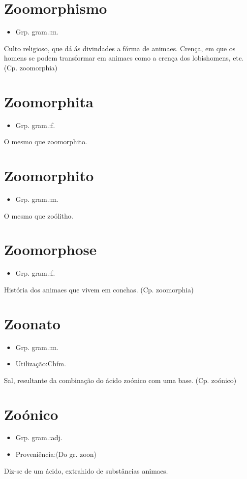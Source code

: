 \section{Zoomorphismo}
\begin{itemize}
\item {Grp. gram.:m.}
\end{itemize}
Culto religioso, que dá ás divindades a fórma de animaes.
Crença, em que os homens se podem transformar em animaes como a crença dos lobishomens, etc.
(Cp. \textunderscore zoomorphia\textunderscore )
\section{Zoomorphita}
\begin{itemize}
\item {Grp. gram.:f.}
\end{itemize}
O mesmo que \textunderscore zoomorphito\textunderscore .
\section{Zoomorphito}
\begin{itemize}
\item {Grp. gram.:m.}
\end{itemize}
O mesmo que \textunderscore zoólitho\textunderscore .
\section{Zoomorphose}
\begin{itemize}
\item {Grp. gram.:f.}
\end{itemize}
História dos animaes que vivem em conchas.
(Cp. \textunderscore zoomorphia\textunderscore )
\section{Zoonato}
\begin{itemize}
\item {Grp. gram.:m.}
\end{itemize}
\begin{itemize}
\item {Utilização:Chím.}
\end{itemize}
Sal, resultante da combinação do ácido zoónico com uma base.
(Cp. \textunderscore zoónico\textunderscore )
\section{Zoónico}
\begin{itemize}
\item {Grp. gram.:adj.}
\end{itemize}
\begin{itemize}
\item {Proveniência:(Do gr. \textunderscore zoon\textunderscore )}
\end{itemize}
Diz-se de um ácido, extrahido de substâncias animaes.
